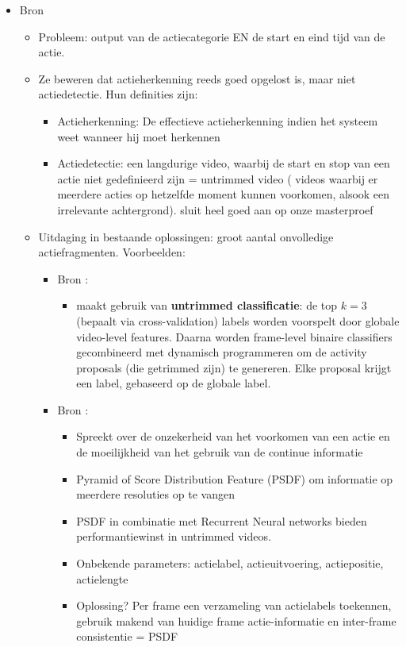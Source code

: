 \begin{itemize}
	\item Bron \cite{Temporal-Action-Detection-with-Structured-Segment-Networks}
	\begin{itemize}
		\item Probleem: output van de actiecategorie EN de start en eind tijd van de actie. 
		\item Ze beweren dat actieherkenning reeds goed opgelost is, maar niet actiedetectie. Hun definities zijn: 
		\begin{itemize}
			\item Actieherkenning: De effectieve actieherkenning indien het systeem weet wanneer hij moet herkennen
			\item Actiedetectie: een langdurige video, waarbij de start en stop van een actie niet gedefinieerd zijn = untrimmed video ( videos waarbij er meerdere acties op hetzelfde moment kunnen voorkomen, alsook een irrelevante achtergrond). {\color{green} sluit heel goed aan op onze masterproef}
		\end{itemize}
		\item Uitdaging in bestaande oplossingen: groot aantal onvolledige actiefragmenten. Voorbeelden:
		\begin{itemize}
			\item Bron \cite{singh2016untrimmed}:
			\begin{itemize}
				\item maakt gebruik van \textbf{untrimmed classificatie}: de top $k = 3$ (bepaalt via cross-validation) labels worden voorspelt door globale video-level features. Daarna worden frame-level binaire classifiers gecombineerd met dynamisch programmeren om de activity proposals (die getrimmed zijn) te genereren. Elke proposal krijgt een label, gebaseerd op de globale label.
			\end{itemize}
				\item Bron \cite{Temporal-Action-Localization-with-Pyramid-of-Score-Distribution-Features}:
			\begin{itemize}
				\item Spreekt over de onzekerheid van het voorkomen van een actie en de moeilijkheid van het gebruik van de continue informatie

				\item Pyramid of Score Distribution Feature (PSDF) om informatie op meerdere resoluties op te vangen
				\item PSDF in combinatie met Recurrent Neural networks bieden performantiewinst in untrimmed videos.
				\item Onbekende parameters: actielabel, actieuitvoering, actiepositie, actielengte
				\item Oplossing? Per frame een verzameling van actielabels toekennen, gebruik makend van huidige frame actie-informatie en inter-frame consistentie = PSDF
	

\end{itemize}
\end{itemize}
\end{itemize}
\end{itemize}
